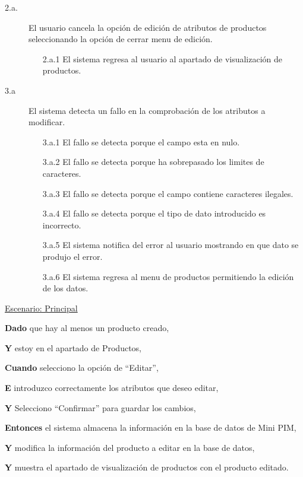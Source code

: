 \begin{description}
    \item[2.a.] El usuario cancela la opción de edición de atributos de productos seleccionando la opción de cerrar menu de edición.
    \begin{enumerate}
        \item[2.a.1] El sistema regresa al usuario al apartado de visualización de productos.
    \end{enumerate}

    \item[3.a] El sistema detecta un fallo en la comprobación de los atributos a modificar.
    \begin{enumerate}
        \item[3.a.1] El fallo se detecta porque el campo esta en nulo.
        \item[3.a.2] El fallo se detecta porque ha sobrepasado los limites de caracteres.
        \item[3.a.3] El fallo se detecta porque el campo contiene caracteres ilegales.
        \item[3.a.4] El fallo se detecta porque el tipo de dato introducido es incorrecto.
        \item[3.a.5] El sistema notifica del error al usuario mostrando en que dato se produjo el error.
        \item[3.a.6] El sistema regresa al menu de productos permitiendo la edición de los datos.
    \end{enumerate}
\end{description}

\underline{Escenario: Principal}\par
\vspace{0.15cm}
\textbf{Dado} que hay al menos un producto creado,\par
\textbf{Y} estoy en el apartado de Productos,\par
\textbf{Cuando} selecciono la opción de \enquote{Editar},\par
\textbf{E} introduzco correctamente los atributos que deseo editar,\par
\textbf{Y} Selecciono \enquote{Confirmar} para guardar los cambios,\par
\textbf{Entonces} el sistema almacena la información en la base de datos de Mini PIM,\par
\textbf{Y} modifica la información del producto a editar en la base de datos,\par
\textbf{Y} muestra el apartado de visualización de productos con el producto editado.\par
\vspace{0.20cm}

